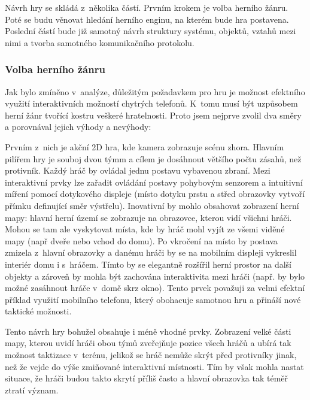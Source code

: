 \documentclass[thesis=B,czech,hidelinks]{FITthesis}[2012/06/26] %
\begin{document}
Návrh hry se skládá z~několika částí. Prvním krokem je volba herního žánru. Poté se budu věnovat hledání herního enginu, na kterém bude hra postavena. Poslední částí bude již samotný návrh struktury systému, objektů, vztahů mezi nimi a tvorba samotného komunikačního protokolu.

\subsubsection{Volba herního žánru}

Jak bylo zmíněno v~analýze, důležitým požadavkem pro hru je možnost efektního využití interaktivních možností chytrých telefonů. K~tomu musí být uzpůsobem herní žánr tvořící kostru veškeré hratelnosti. Proto jsem nejprve zvolil dva směry a porovnával jejich výhody a nevýhody:

Prvním z~nich je akční 2D hra, kde kamera zobrazuje scénu zhora. Hlavním pilířem hry je souboj dvou týmm a cílem je dosáhnout většího počtu zásahů, než protivník. Každý hráč by ovládal jednu postavu vybavenou zbraní. Mezi interaktivní prvky lze zařadit ovládání postavy pohybovým senzorem a intuitivní míření pomocí dotykového displeje (místo dotyku prstu a střed obrazovky vytvoří přímku definující směr výstřelu). Inovativní by mohlo obsahovat zobrazení herní mapy: hlavní herní území se zobrazuje na obrazovce, kterou vidí všichni hráči. Mohou se tam ale vyskytovat místa, kde by hráč mohl vyjít ze všemi viděné mapy (např dveře nebo vchod do domu). Po vkročení na místo by postava zmizela z~hlavní obrazovky a danému hráči by se na mobilním displeji vykreslil interiér domu i s~hráčem. Tímto by se elegantně rozšířil herní prostor na další objekty a zároveň by mohla být zachována interaktivita mezi hráči (např. by bylo možné zasáhnout hráče v~domě skrz okno). Tento prvek považuji za velmi efektní příklad využití mobilního telefonu, který obohacuje samotnou hru a přináší nové taktické možnosti.

Tento návrh hry bohužel obsahuje i méně vhodné prvky. Zobrazení velké části mapy, kterou uvidí hráči obou týmů zveřejňuje pozice všech hráčů a ubírá tak možnost taktizace v~terénu, jelikož se hráč nemůže skrýt před protivníky jinak, než že vejde do výše zmiňované interaktivní místnosti. Tím by však mohla nastat situace, že hráči budou takto skrytí příliš často a hlavní obrazovka tak téměř ztratí význam.
\end{document}
